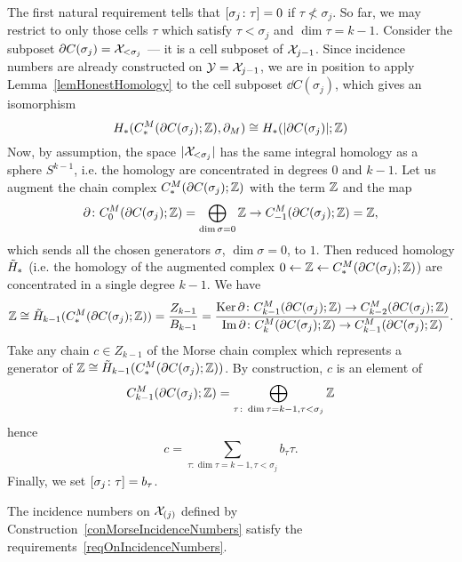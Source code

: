 \begin{con}
The first natural requirement tells that $[\sigma_j\colon \tau]=0$ if $\tau\nless\sigma_j$. So far, we may restrict to only those cells $\tau$ which satisfy $\tau<\sigma_j$ and $\dim\tau=k-1$. Consider the subposet $\partial C(\sigma_j)=\mathcal{X}_{<\sigma_j}$ --- it is a cell subposet of $\mathcal{X}_{j-1}$. Since incidence numbers are already constructed on $\mathcal{Y}=\mathcal{X}_{j-1}$, we are in position to apply Lemma~\ref{lemHonestHomology} to the cell subposet $\dd C(\sigma_j)$, which gives an isomorphism
\[
H_*(C^M_*(\partial C(\sigma_j);\mathbb{Z}),\partial_M)\cong H_*(|\partial C(\sigma_j)|;\mathbb{Z})
\]
Now, by assumption, the space $|\mathcal{X}_{<\sigma_j}|$ has the same integral homology as a sphere $S^{k-1}$, i.e. the homology are concentrated in degrees $0$ and $k-1$. Let us augment the chain complex $C^M_*(\partial C(\sigma_j);\mathbb{Z})$ with the term $\mathbb{Z}$ and the map
\[
\partial\colon C^M_0(\partial C(\sigma_j);\mathbb{Z})=\bigoplus_{\dim\sigma=0}\mathbb{Z}\to C^M_{-1}(\partial C(\sigma_j);\mathbb{Z})=\mathbb{Z},
\]
which sends all the chosen generators $\sigma$, $\dim\sigma=0$, to $1$. Then reduced homology $\tilde{H}_*$ (i.e. the homology of the augmented complex $0\leftarrow\mathbb{Z}\leftarrow C^M_*(\partial C(\sigma_j);\mathbb{Z})$) are concentrated in a single degree $k-1$. We have
\[
\mathbb{Z}\cong \tilde{H}_{k-1}(C^M_\ast(\partial C(\sigma_j);\mathbb{Z}))=\dfrac{Z_{k-1}}{B_{k-1}}=\dfrac{\operatorname{Ker}\partial\colon C^M_{k-1}(\partial C(\sigma_j);\mathbb{Z})\to C^M_{k-2}(\partial C(\sigma_j);\mathbb{Z})}{\operatorname{Im} \partial\colon C^M_k(\partial C(\sigma_j);\mathbb{Z})\to C^M_{k-1}(\partial C(\sigma_j);\mathbb{Z})}.
\]
Take any chain $c\in Z_{k-1}$ of the Morse chain complex which represents a generator of $\mathbb{Z}\cong\tilde{H}_{k-1}(C_*^M(\partial C(\sigma_j);\mathbb{Z}))$. By construction, $c$ is an element of
\[
C^M_{k-1}(\partial C(\sigma_j);\mathbb{Z})=\bigoplus_{\tau\colon \dim\tau=k-1, \tau<\sigma_j}\mathbb{Z}
\]
hence
\[
c=\sum\limits_{\tau\colon \dim\tau=k-1, \tau<\sigma_j}b_\tau \tau.
\]
Finally, we set $[\sigma_j\colon \tau]=b_\tau$.
\end{con}

\begin{lem}\label{lemIncNumbersInductionStep}
The incidence numbers on $\mathcal{X}_{(j)}$ defined by Construction~\ref{conMorseIncidenceNumbers} satisfy the requirements~\ref{reqOnIncidenceNumbers}.
\end{lem}

